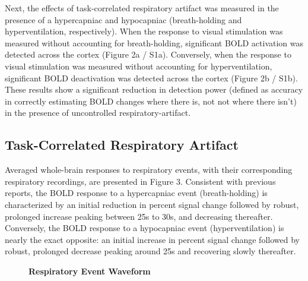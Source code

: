 \documentclass[9pt]{NEU502b-fmri}
\begin{document}
Next, the effects of task-correlated respiratory artifact was measured in the presence of a hypercapniac and hypocapniac (breath-holding and hyperventilation, respectively). When the response to visual stimulation was measured without accounting for breath-holding, significant BOLD activation was detected across the cortex (Figure 2a / S1a). Conversely, when the response to visual stimulation was measured without accounting for hyperventilation, significant BOLD deactivation was detected across the cortex (Figure 2b / S1b). These results show a significant reduction in detection power (defined as accuracy in correctly estimating BOLD changes where there is, not not where there isn’t) in the presence of uncontrolled respiratory-artifact. 

\subsection{Task-Correlated Respiratory Artifact}
Averaged whole-brain responses to respiratory events, with their corresponding respiratory recordings, are presented in Figure 3. Consistent with previous reports, the BOLD response to a hypercapniac event (breath-holding) is characterized by an initial reduction in percent signal change followed by robust, prolonged increase peaking between 25s to 30s, and decreasing thereafter. Conversely,  the BOLD response to a hypocapniac event (hyperventilation) is nearly the exact opposite: an initial increase in percent signal change followed by robust, prolonged decrease peaking around 25s and recovering slowly thereafter. 

\begin{figure}
\centerline{%
%
}
\caption{\textbf{Respiratory Event Waveform}}

\end{figure}
\end{document}
